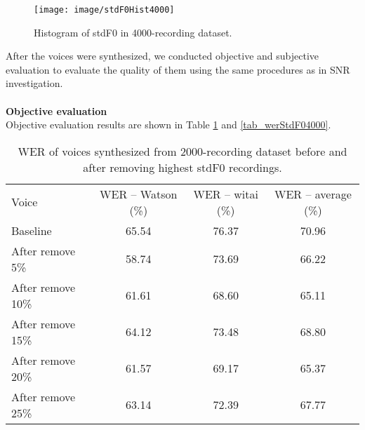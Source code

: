 \documentclass[12pt]{article}
\begin{document}
\begin{figure}[t]
\begin{center}
\texttt{[image: image/stdF0Hist4000]}
\end{center}
\vspace{-0.3cm}
\caption[stdF0 Hist 4000.]{Histogram of stdF0 in 4000-recording dataset.}
\label{fig_stdF0Hist4000}
\end{figure}

After the voices were synthesized, we conducted objective and subjective evaluation to evaluate the quality of them using the same procedures as in SNR investigation.\\\\
\textbf{Objective evaluation}
\vspace{0.28cm}\\
Objective evaluation results are shown in Table \ref{tab_werStdF02000} and \ref{tab_werStdF04000}.

\begin{table}[]
\begin{center}
\caption{WER of voices synthesized from 2000-recording dataset before and after removing highest stdF0 recordings.}
\label{tab_werStdF02000}
\vspace{3mm}
\begin{tabular}{lccc}
\hline
Voice & WER – Watson (\%) & WER – witai (\%) & WER – average (\%)\\
\cmidrule(l{0pt}r{2pt}){1-1}\cmidrule(l{0pt}r{2pt}){2-2}\cmidrule(l{0pt}r{2pt}){3-3}\cmidrule(l{0pt}r{2pt}){4-4}
Baseline          & 65.54 & 76.37 & 70.96 \\
After remove 5\%  & 58.74 & 73.69 & 66.22 \\
After remove 10\% & 61.61 & 68.60 & 65.11 \\
After remove 15\% & 64.12 & 73.48 & 68.80 \\
After remove 20\% & 61.57 & 69.17 & 65.37 \\
After remove 25\% & 63.14 & 72.39 & 67.77 \\
\hline
\end{tabular}
\end{center}
\end{table}
\end{document}

